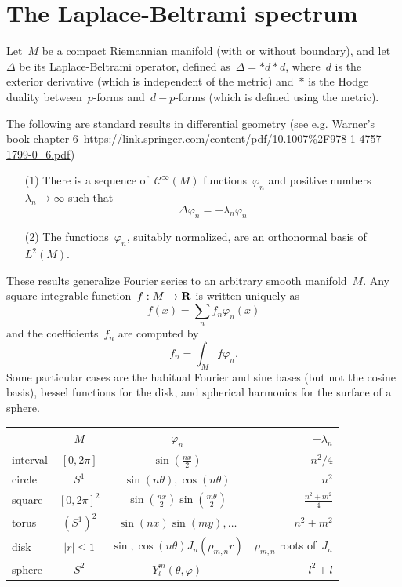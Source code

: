 \section{The Laplace-Beltrami spectrum}

Let~$M$ be a compact Riemannian manifold (with or without boundary), and
let~$\Delta$ be its Laplace-Beltrami operator, defined
as~$\Delta=*d*d$, where~$d$ is the exterior derivative (which is independent
of the metric) and~$*$ is the Hodge duality between~$p$-forms
and~$d-p$-forms (which is defined using the metric).

The following are standard results in differential geometry (see e.g.
Warner's book chapter
6~\url{https://link.springer.com/content/pdf/10.1007\%2F978-1-4757-1799-0_6.pdf})

\begin{itemize}
	\item[(1)] There is a sequence of~$\mathcal{C}^\infty(M)$
		functions~$\varphi_n$ and positive
		numbers~$\lambda_n\to\infty$ such that
		$$\Delta\varphi_n=-\lambda_n\varphi_n$$
	\item[(2)] The functions~$\varphi_n$, suitably normalized, are an
		orthonormal basis of~$L^2(M)$.
\end{itemize}

These results generalize Fourier series to an arbitrary smooth manifold~$M$.
Any square-integrable function~$f:M\to\mathbf{R}$ is written uniquely as
$$f(x)=\sum_nf_n\varphi_n(x)$$ and the coefficients~$f_n$ are computed by
$$f_n=\int_Mf\varphi_n.$$  Some particular cases are the habitual Fourier and
sine bases (but not the cosine basis), bessel functions for the disk, and
spherical harmonics for the surface of a sphere.

\begin{tabular}{lccr}
	&$M$ & $\varphi_n$ & $-\lambda_n$ \\
	\hline
	interval & $[0,2\pi]$ & $\sin\left(\frac{nx}{2}\right)$ & $n^2/4$ \\
	circle & $S^1$ & $\sin(n\theta),\cos(n\theta)$ & $n^2$ \\
	square & $[0,2\pi]^2$ &
	$\sin\left(\frac{nx}{2}\right)\sin\left(\frac{m\theta}{2}\right)$ &
	$\frac{n^2+m^2}{4}$ \\
	torus & $(S^1)^2$ & $\sin(nx)\sin(my),\ldots$ & $n^2+m^2$ \\
	disk & $|r|\le1$ & $\sin,\cos(n\theta)J_n(\rho_{m,n}r)$ &
	$\rho_{m,n}$ roots of~$J_n$ \\
	sphere & $S^2$ & $Y^m_l(\theta,\varphi)$ & $l^2+l$
\end{tabular}

